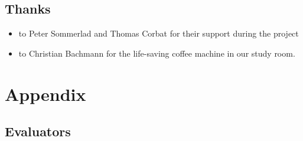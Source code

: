 \documentclass[12pt,halfparskip,DIV11,BCOR10mm]{scrreprt}
\begin{document}
\section{Thanks}

\begin{itemize}
    \item to Peter Sommerlad and Thomas Corbat for their support during the project
    \item to Christian Bachmann for the life-saving coffee machine in our study room. 
\end{itemize}



\setcounter{secnumdepth}{-1}
\chapter{Appendix}

\section{Evaluators}
\end{document}
